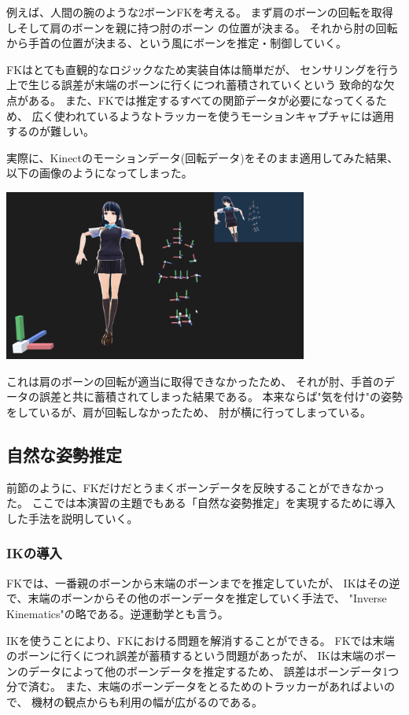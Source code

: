 \documentclass[a4j]{jsarticle}
\begin{document}
例えば、人間の腕のような2ボーンFKを考える。
まず肩のボーンの回転を取得しそして肩のボーンを親に持つ肘のボーン
の位置が決まる。
それから肘の回転から手首の位置が決まる、という風にボーンを推定・制御していく。

FKはとても直観的なロジックなため実装自体は簡単だが、
センサリングを行う上で生じる誤差が末端のボーンに行くにつれ蓄積されていくという
致命的な欠点がある。
また、FKでは推定するすべての関節データが必要になってくるため、
広く使われているようなトラッカーを使うモーションキャプチャには適用するのが難しい。

実際に、Kinectのモーションデータ(回転データ)をそのまま適用してみた結果、
以下の画像のようになってしまった。

\includegraphics[width=10cm]{img/fk-noise}

これは肩のボーンの回転が適当に取得できなかったため、
それが肘、手首のデータの誤差と共に蓄積されてしまった結果である。
本来ならば"気を付け"の姿勢をしているが、肩が回転しなかったため、
肘が横に行ってしまっている。


\subsection{自然な姿勢推定}

前節のように、FKだけだとうまくボーンデータを反映することができなかった。
ここでは本演習の主題でもある「自然な姿勢推定」を実現するために導入した手法を説明していく。

\subsubsection{IKの導入}

FKでは、一番親のボーンから末端のボーンまでを推定していたが、
IKはその逆で、末端のボーンからその他のボーンデータを推定していく手法で、
"Inverse Kinematics"の略である。逆運動学とも言う。

IKを使うことにより、FKにおける問題を解消することができる。
FKでは末端のボーンに行くにつれ誤差が蓄積するという問題があったが、
IKは末端のボーンのデータによって他のボーンデータを推定するため、
誤差はボーンデータ1つ分で済む。
また、末端のボーンデータをとるためのトラッカーがあればよいので、
機材の観点からも利用の幅が広がるのである。
\end{document}
